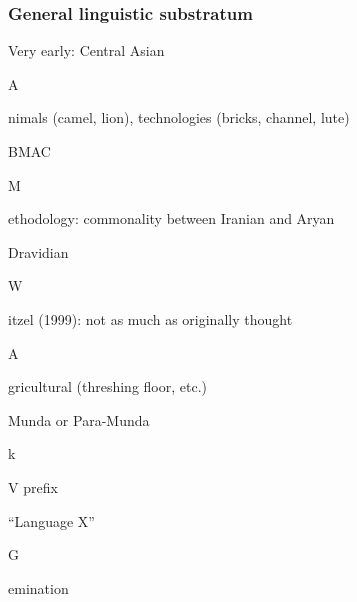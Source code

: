 \documentclass[pdf]{beamer}
\newcommand{\Subitem}[1]{{\setlength\itemindent{12pt} \item[-] #1}}
\begin{document}
\begin{frame} \frametitle{General linguistic substratum}
\begin{itemize}
	\item Very early: Central Asian
	\Subitem Animals (camel, lion), technologies (bricks, channel, lute)
	\item BMAC
	\Subitem Methodology: commonality between Iranian and Aryan
	\item Dravidian
	\Subitem Witzel (1999): not as much as originally thought
	\Subitem Agricultural (threshing floor, etc.)
	\item Munda or Para-Munda
	\Subitem kV prefix
	\item ``Language X''
	\Subitem Gemination
\end{itemize}
\end{frame}

\end{document}
